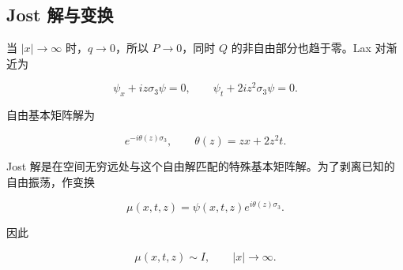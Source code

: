 \documentclass[
    lang=cn,
    scheme=chinese,
    mode=simple,
    device=normal,
    color=blue,
    math=cm,
    thmcnt=section,
    12pt
]{elegantbook}
\begin{document}



\subsection{Jost 解与变换}

当 $\lvert x\rvert\to\infty$ 时，$q\to0$，所以 $P\to0$，同时 $Q$ 的非自由部分也趋于零。Lax 对渐近为

\[
    \psi_x+iz\sigma_3\psi=0,\qquad
    \psi_t+2iz^2\sigma_3\psi=0.
\]

自由基本矩阵解为

\[
    e^{-i\theta(z)\sigma_3},
    \qquad
    \theta(z)=zx+2z^2t.
\]

Jost 解是在空间无穷远处与这个自由解匹配的特殊基本矩阵解。为了剥离已知的自由振荡，作变换

\begin{equation}
    \mu(x,t,z)=\psi(x,t,z)e^{i\theta(z)\sigma_3}.
    \tag{5.1.5}
    \label{eq:5.1.5}
\end{equation}

因此

\begin{equation}
    \mu(x,t,z)\sim I,\qquad \lvert x\rvert\to\infty.
    \tag{5.1.6}
    \label{eq:5.1.6}
\end{equation}
\end{document}
